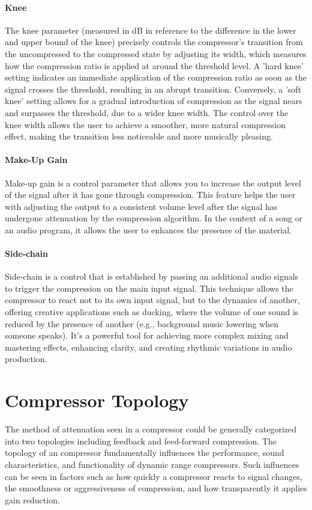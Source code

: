 \documentclass[10pt]{article}
\begin{document}
\begin{multicols*}{2}
            \paragraph{Knee}
                The knee parameter (measured in dB in reference to the difference in the lower and upper bound of the knee) precisely controls the compressor's transition from the uncompressed to the compressed state by adjusting its width, which measures how the compression ratio is applied at around the threshold level. A 'hard knee' setting indicates an immediate application of the compression ratio as soon as the signal crosses the threshold, resulting in an abrupt transition. Conversely, a 'soft knee' setting allows for a gradual introduction of compression as the signal nears and surpasses the threshold, due to a wider knee width. The control over the knee width allows the user to achieve a smoother, more natural compression effect, making the transition less noticeable and more musically pleasing.
            
            \paragraph{Make-Up Gain}
                Make-up gain is a control parameter that allows you to increase the output level of the signal after it has gone through compression. This feature helps the user with adjusting the output to a consistent volume level after the signal has undergone attenuation by the compression algorithm. In the context of a song or an audio program, it allows the user to enhances the presence of the material.

            \paragraph{Side-chain}
                Side-chain is a control that is established by passing an additional audio signals to trigger the compression on the main input signal. This technique allows the compressor to react not to its own input signal, but to the dynamics of another, offering creative applications such as ducking, where the volume of one sound is reduced by the presence of another (e.g., background music lowering when someone speaks). It's a powerful tool for achieving more complex mixing and mastering effects, enhancing clarity, and creating rhythmic variations in audio production.

        \section{Compressor Topology}
            The method of attenuation seen in a compressor could be generally categorized into two topologies including feedback and feed-forward compression. The topology of an compressor fundamentally influences the performance, sound characteristics, and functionality of dynamic range compressors. Such influences can be seen in factors such as how quickly a compressor reacts to signal changes, the smoothness or aggressiveness of compression, and how transparently it applies gain reduction.
    

\end{multicols*}
\end{document}
